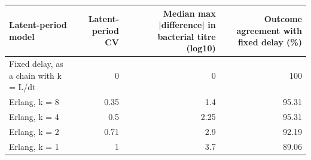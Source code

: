 \begin{tabular}{lrrr}
\toprule
Latent-period model & Latent-period CV & Median max |difference| in bacterial titre (log10) & Outcome agreement with fixed delay (\%) \\
\midrule
Fixed delay, as a chain with k = L/dt & 0 & 0 & 100 \\
Erlang, k = 8 & 0.35 & 1.4 & 95.31 \\
Erlang, k = 4 & 0.5 & 2.25 & 95.31 \\
Erlang, k = 2 & 0.71 & 2.9 & 92.19 \\
Erlang, k = 1 & 1 & 3.7 & 89.06 \\
\bottomrule
\end{tabular}
